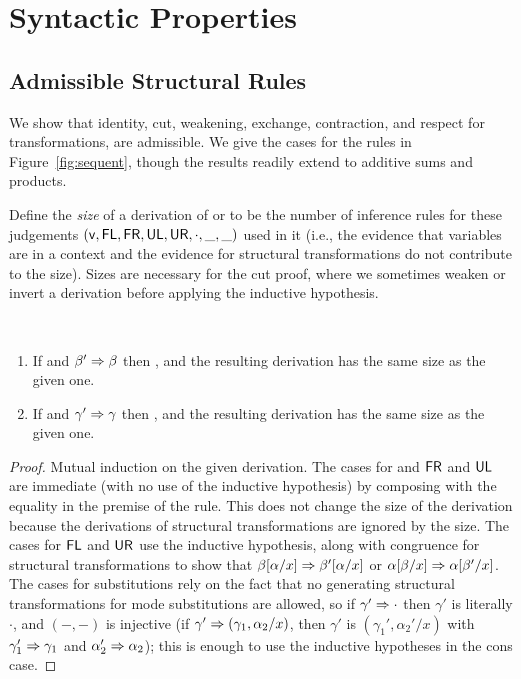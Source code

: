 
\section{Syntactic Properties}
\label{sec:synprop-long}


\subsection{Admissible Structural Rules}
We show that identity, cut, weakening, exchange, contraction, and
respect for transformations, are admissible.  We give the cases for the
rules in Figure~\ref{fig:sequent}, though the results readily extend to
additive sums and products.

Define the \emph{size} of a derivation of  or
\seq{\Gamma}{\gamma}{\Delta} to be the number of inference rules for
these judgements $(\mathsf{v},\mathsf{FL}, \mathsf{FR}, \mathsf{UL}, \mathsf{UR}, \cdot, \_,\_)$ used in it
(i.e., the evidence that variables are in a context and the evidence for
structural transformations do not contribute to the size).  Sizes are
necessary for the cut proof, where we sometimes weaken or invert a
derivation before applying the inductive hypothesis.

\begin{lemma} ~ \label{lem:respectspr}
\begin{enumerate}
\item If  and $\beta' \Rightarrow \beta$ then
  , and the resulting derivation has the same
  size as the given one.
\item If \seq{\Gamma}{\gamma}{\Delta} and $\gamma' \Rightarrow \gamma$ then
  , and the resulting derivation has the
  same size as the given one.
\end{enumerate}
\end{lemma}
\begin{proof}
Mutual induction on the given derivation.  The cases for  and
$\mathsf{FR}$ and $\mathsf{UL}$ are immediate (with no use of the inductive hypothesis)
by composing with the equality in the premise of the rule.  This does
not change the size of the derivation because the derivations of
structural transformations are ignored by the size.  The cases for $\mathsf{FL}$ and
$\mathsf{UR}$ use the inductive hypothesis, along with congruence for structural
transformations to show that $\beta[\alpha/x] \Rightarrow
\beta'[\alpha/x]$ or $\alpha[\beta/x] \Rightarrow
\alpha[\beta'/x]$.  The cases for substitutions rely on the
fact that no generating structural transformations for mode substitutions are
allowed, so if $\gamma' \Rightarrow \cdot$ then $\gamma'$ is literally $\cdot$,
and $(-,-)$ is injective (if $\gamma' \Rightarrow (\gamma_1,\alpha_2/x)$, then
$\gamma'$ is $(\gamma_1',\alpha_2'/x)$ with $\gamma_1' \Rightarrow \gamma_1$
and $\alpha_2' \Rightarrow \alpha_2$); this is enough to use the inductive
hypotheses in the cons case.
\end{proof}

